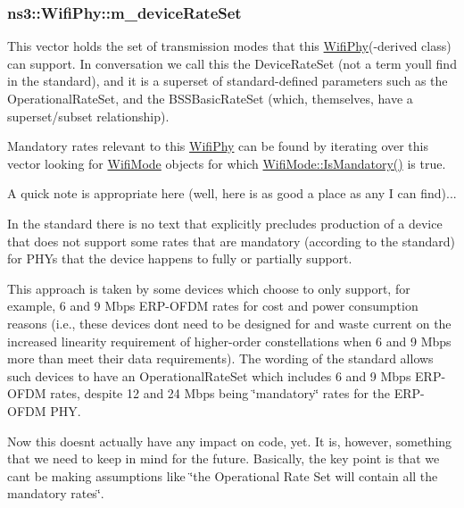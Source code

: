 \subsubsection[{\texorpdfstring{m\+\_\+device\+Rate\+Set}{m_deviceRateSet}}]{ ns3\+::\+Wifi\+Phy\+::m\+\_\+device\+Rate\+Set\hspace{0.3cm}{\ttfamily [private]}}\hypertarget{classns3_1_1WifiPhy_a0e0115fc8fa16ab9ed50e3e87d8d95d2}{}\label{classns3_1_1WifiPhy_a0e0115fc8fa16ab9ed50e3e87d8d95d2}
This vector holds the set of transmission modes that this \hyperlink{classns3_1_1WifiPhy}{Wifi\+Phy}(-\/derived class) can support. In conversation we call this the Device\+Rate\+Set (not a term you\textquotesingle{}ll find in the standard), and it is a superset of standard-\/defined parameters such as the Operational\+Rate\+Set, and the B\+S\+S\+Basic\+Rate\+Set (which, themselves, have a superset/subset relationship).

Mandatory rates relevant to this \hyperlink{classns3_1_1WifiPhy}{Wifi\+Phy} can be found by iterating over this vector looking for \hyperlink{classns3_1_1WifiMode}{Wifi\+Mode} objects for which \hyperlink{classns3_1_1WifiMode_ad7db9c41e193eb656c8dc66ec68cf0d0}{Wifi\+Mode\+::\+Is\+Mandatory()} is true.

A quick note is appropriate here (well, here is as good a place as any I can find)...

In the standard there is no text that explicitly precludes production of a device that does not support some rates that are mandatory (according to the standard) for P\+H\+Ys that the device happens to fully or partially support.

This approach is taken by some devices which choose to only support, for example, 6 and 9 Mbps E\+R\+P-\/\+O\+F\+DM rates for cost and power consumption reasons (i.\+e., these devices don\textquotesingle{}t need to be designed for and waste current on the increased linearity requirement of higher-\/order constellations when 6 and 9 Mbps more than meet their data requirements). The wording of the standard allows such devices to have an Operational\+Rate\+Set which includes 6 and 9 Mbps E\+R\+P-\/\+O\+F\+DM rates, despite 12 and 24 Mbps being \char`\"{}mandatory\char`\"{} rates for the E\+R\+P-\/\+O\+F\+DM P\+HY.

Now this doesn\textquotesingle{}t actually have any impact on code, yet. It is, however, something that we need to keep in mind for the future. Basically, the key point is that we can\textquotesingle{}t be making assumptions like \char`\"{}the Operational Rate Set will contain all the
mandatory rates\char`\"{}. 

